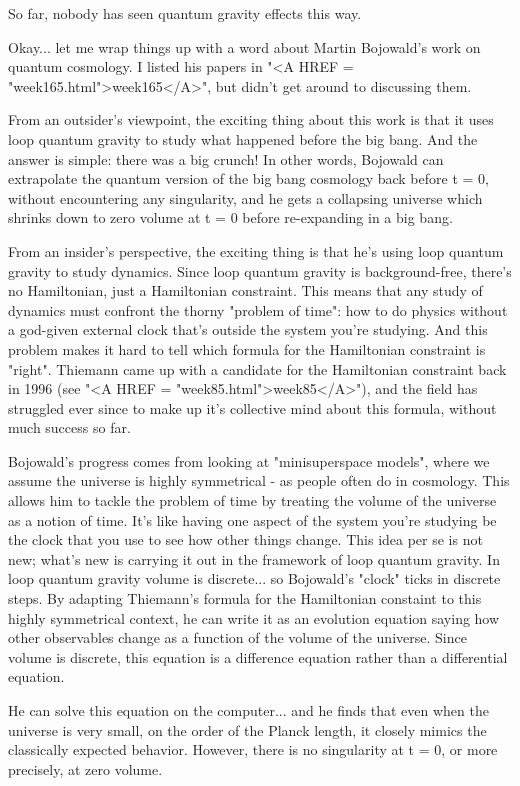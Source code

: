 So far, nobody has seen quantum gravity effects this way.

Okay... let me wrap things up with a word about Martin Bojowald's work
on quantum cosmology.  I listed his papers in "<A HREF = "week165.html">week165</A>", but didn't
get around to discussing them.  

From an outsider's viewpoint, the exciting thing about this work is
that it uses loop quantum gravity to study what happened before the
big bang.  And the answer is simple: there was a big crunch!  In other
words, Bojowald can extrapolate the quantum version of the big bang
cosmology back before t = 0, without encountering any singularity, 
and he gets a collapsing universe which shrinks down to zero volume at 
t = 0 before re-expanding in a big bang.

From an insider's perspective, the exciting thing is that he's using
loop quantum gravity to study dynamics.  Since loop quantum gravity is
background-free, there's no Hamiltonian, just a Hamiltonian
constraint.  This means that any study of dynamics must confront the
thorny "problem of time": how to do physics without a god-given
external clock that's outside the system you're studying.  And this
problem makes it hard to tell which formula for the Hamiltonian
constraint is "right".  Thiemann came up with a candidate for the
Hamiltonian constraint back in 1996 (see "<A HREF = "week85.html">week85</A>"), and the field has
struggled ever since to make up it's collective mind about this formula,
without much success so far.

Bojowald's progress comes from looking at "minisuperspace models",
where we assume the universe is highly symmetrical - as people often
do in cosmology.  This allows him to tackle the problem of time by
treating the volume of the universe as a notion of time.  It's like
having one aspect of the system you're studying be the clock that you
use to see how other things change.  This idea per se is not new;
what's new is carrying it out in the framework of loop quantum
gravity.  In loop quantum gravity volume is discrete... so Bojowald's
"clock" ticks in discrete steps.  By adapting Thiemann's formula for
the Hamiltonian constaint to this highly symmetrical context, he can
write it as an evolution equation saying how other observables change
as a function of the volume of the universe.  Since volume is
discrete, this equation is a difference equation rather than a
differential equation.

He can solve this equation on the computer... and he finds that even
when the universe is very small, on the order of the Planck length, it
closely mimics the classically expected behavior.  However, there is
no singularity at t = 0, or more precisely, at zero volume.

